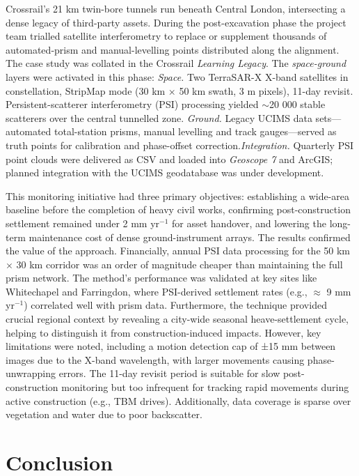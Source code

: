 \documentclass[preprint,11pt,authoryear,3p]{elsarticle}
\begin{document}
Crossrail’s 21 km twin-bore tunnels run beneath Central London, intersecting a dense legacy of third-party assets.  During the post-excavation phase the project team trialled satellite interferometry to replace or supplement thousands of automated‐prism and manual-levelling points distributed along the alignment.  The case study was collated in the Crossrail \textit{Learning Legacy}. The \emph{space-ground} layers were activated in this phase: \emph{Space.} Two TerraSAR-X X-band satellites in constellation, StripMap mode (30 km × 50 km swath, 3 m pixels), 11-day revisit. Persistent-scatterer interferometry (PSI) processing yielded $\sim$20 000 stable scatterers over the central tunnelled zone. \emph{Ground.}  Legacy UCIMS data sets—automated total-station prisms, manual levelling and track gauges—served as truth points for calibration and phase-offset correction.\emph{Integration.}  Quarterly PSI point clouds were delivered as CSV and loaded into \textit{Geoscope 7} and ArcGIS; planned integration with the UCIMS geodatabase was under development.

This monitoring initiative had three primary objectives: establishing a wide-area baseline before the completion of heavy civil works, confirming post-construction settlement remained under 2 mm yr$^{-1}$ for asset handover, and lowering the long-term maintenance cost of dense ground-instrument arrays.
The results confirmed the value of the approach. Financially, annual PSI data processing for the 50 km $\times$ 30 km corridor was an order of magnitude cheaper than maintaining the full prism network. The method's performance was validated at key sites like Whitechapel and Farringdon, where PSI-derived settlement rates (e.g., $\approx$ 9 mm yr$^{-1}$) correlated well with prism data. Furthermore, the technique provided crucial regional context by revealing a city-wide seasonal heave-settlement cycle, helping to distinguish it from construction-induced impacts.
However, key limitations were noted, including a motion detection cap of ±15 mm between images due to the X-band wavelength, with larger movements causing phase-unwrapping errors. The 11-day revisit period is suitable for slow post-construction monitoring but too infrequent for tracking rapid movements during active construction (e.g., TBM drives). Additionally, data coverage is sparse over vegetation and water due to poor backscatter.
  
\section{Conclusion}
\end{document}
